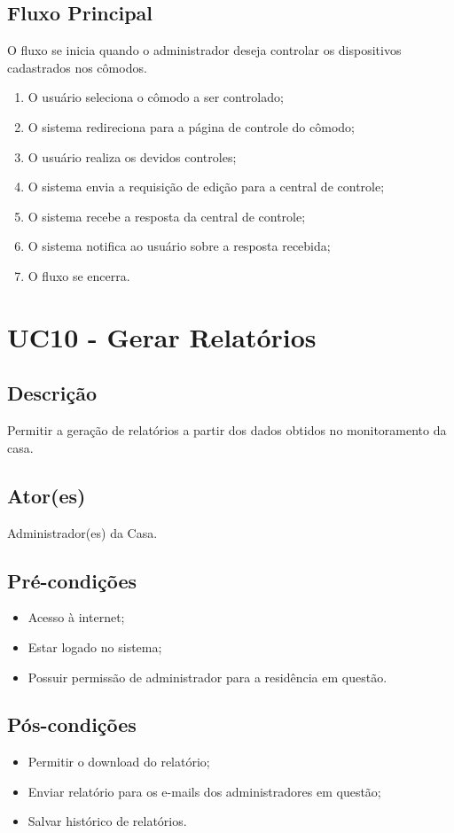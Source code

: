     \subsection{Fluxo Principal}
        O fluxo se inicia quando o administrador deseja controlar os dispositivos cadastrados nos cômodos.
        \begin{enumerate}
            \item O usuário seleciona o cômodo a ser controlado;
            \item O sistema redireciona para a página de controle do cômodo;
            \item O usuário realiza os devidos controles;
            \item O sistema envia a requisição de edição para a central de controle;
            \item O sistema recebe a resposta da central de controle;
            \item O sistema notifica ao usuário sobre a resposta recebida;
            \item O fluxo se encerra.
        \end{enumerate}

\section{UC10 \-- Gerar Relatórios}
    \subsection{Descrição}
        Permitir a geração de relatórios a partir dos dados obtidos no monitoramento da casa.
    \subsection{Ator(es)}
        Administrador(es) da Casa.
    \subsection{Pré-condições}
        \begin{itemize}
            \item Acesso à internet;
            \item Estar logado no sistema;
            \item Possuir permissão de administrador para a residência em questão.
        \end{itemize}
    \subsection{Pós-condições}
        \begin{itemize}
            \item Permitir o download do relatório;
            \item Enviar relatório para os e-mails dos administradores em questão;
            \item Salvar histórico de relatórios.
        \end{itemize}

